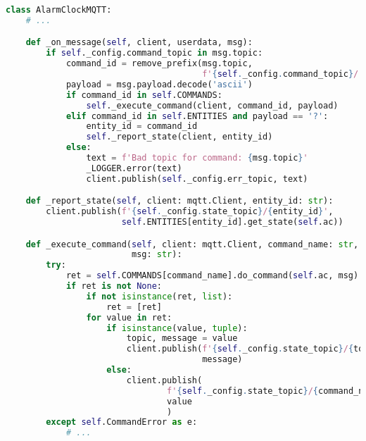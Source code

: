 \begin{lstlisting}[language=Python]
class AlarmClockMQTT:
    # ...

    def _on_message(self, client, userdata, msg):
        if self._config.command_topic in msg.topic:
            command_id = remove_prefix(msg.topic,
                                       f'{self._config.command_topic}/')
            payload = msg.payload.decode('ascii')
            if command_id in self.COMMANDS:
                self._execute_command(client, command_id, payload)
            elif command_id in self.ENTITIES and payload == '?':
                entity_id = command_id
                self._report_state(client, entity_id)
            else:
                text = f'Bad topic for command: {msg.topic}'
                _LOGGER.error(text)
                client.publish(self._config.err_topic, text)

    def _report_state(self, client: mqtt.Client, entity_id: str):
        client.publish(f'{self._config.state_topic}/{entity_id}',
                       self.ENTITIES[entity_id].get_state(self.ac))

    def _execute_command(self, client: mqtt.Client, command_name: str,
                         msg: str):
        try:
            ret = self.COMMANDS[command_name].do_command(self.ac, msg)
            if ret is not None:
                if not isinstance(ret, list):
                    ret = [ret]
                for value in ret:
                    if isinstance(value, tuple):
                        topic, message = value
                        client.publish(f'{self._config.state_topic}/{topic}',
                                       message)
                    else:
                        client.publish(
                                f'{self._config.state_topic}/{command_name}',
                                value
                                )
        except self.CommandError as e:
            # ...
\end{lstlisting}

